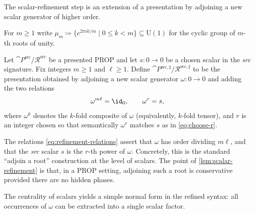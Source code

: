 The scalar-refinement step is an extension of a presentation by adjoining a new scalar generator of
higher order.

\begin{definition}\label{def:mu_m}
For $m\ge 1$ write
\(
  \mu_m \coloneqq \{e^{2\pi i k/m}\mid 0\le k<m\}\subseteq \mathrm{U}(1)
\)
for the cyclic group of $m$-th roots of unity.
\end{definition}

\begin{definition}\label{def:scalar-refined-presentation}
Let $\cat{P}^{\mathrm{src}}/\mathcal{R}^{\mathrm{src}}$ be a presented PROP and let
$s:0\to 0$ be a chosen scalar in the \emph{src} signature.
Fix integers $m\ge 1$ and $\ell\ge 1$.
Define $\cat{P}^{\mathrm{src},\sharp}/\mathcal{R}^{\mathrm{src},\sharp}$ to be the
presentation obtained by adjoining a new scalar generator
\(
  \omega:0\to 0
\)
and adding the two relations
\begin{equation}\label{eq:refinement-relations}
  \omega^{m\ell}=\id_0,
  \qquad
  \omega^{r}=s,
\end{equation}
where $\omega^k$ denotes the $k$-fold composite of $\omega$ (equivalently, $k$-fold tensor),
and $r$ is an integer chosen so that semantically $\omega^r$ matches $s$ as in
\eqref{eq:choose-r}.
\end{definition}

\begin{remark}\label{rem:refinement-intuition}
The relations \eqref{eq:refinement-relations} assert that $\omega$ has order dividing $m\ell$,
and that the \emph{src} scalar $s$ is the $r$-th power of $\omega$.  Concretely, this is the
standard ``adjoin a root'' construction at the level of scalars.  The point of
\cref{lem:scalar-refinement} is that, in a PROP setting, adjoining such a root is
conservative provided there are no hidden phases.
\end{remark}


The centrality of scalars yields a simple normal form in the refined syntax: all occurrences of
$\omega$ can be extracted into a single scalar factor.

